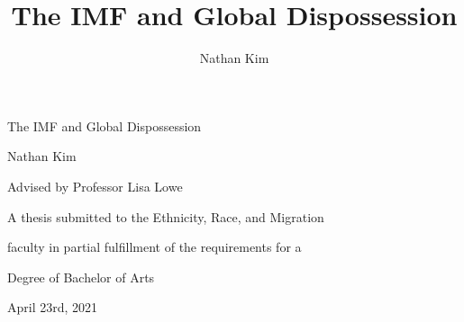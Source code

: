 \title{\Huge The IMF and Global Dispossession}
\author{Nathan Kim}


\begin{titlepage}
  \vspace*{\fill}
  \begin{center}
    
    \vspace{2cm}

    \begin{Huge}
      The IMF and Global Dispossession
    \end{Huge}

    \begin{large}
      Nathan Kim

      Advised by Professor Lisa Lowe
    \end{large}

    \vspace{4cm}
    
    \begin{normalsize}
      A thesis submitted to the Ethnicity, Race, and Migration 
      
      faculty in partial fulfillment of the requirements for a 

      Degree of Bachelor of Arts
    \end{normalsize}

    \vspace{1cm}

    \begin{normalsize}
      April 23rd, 2021
    \end{normalsize}
  \end{center}

  \vspace*{\fill}
\end{titlepage}


\tableofcontents
{}
\clearpage

\setcounter{page}{1}

